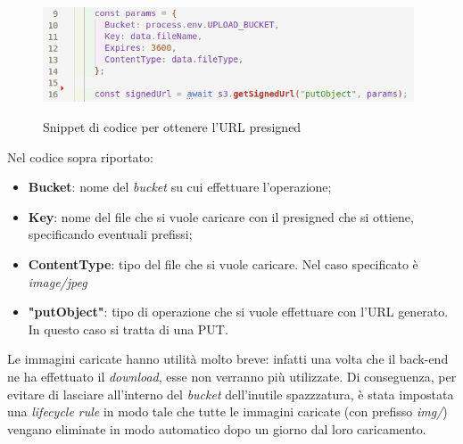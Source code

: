 	\begin{figure}[H]
		\centering
		\includegraphics[width=11cm]{immagini/getURL.png} \\
		\caption{\label{fig:getURL} Snippet di codice per ottenere l'URL presigned}
	\end{figure}
	
	Nel codice sopra riportato:
	\begin{itemize}
		\item \textbf{Bucket}: nome del \emph{bucket} su cui effettuare l'operazione;
		\item \textbf{Key}: nome del file che si vuole caricare con il presigned che si ottiene, specificando eventuali prefissi;
		\item \textbf{ContentType}: tipo del file che si vuole caricare. Nel caso specificato è \emph{image/jpeg}
		\item \textbf{"putObject"}: tipo di operazione che si vuole effettuare con l'URL generato. In questo caso si 
		tratta di una PUT.
	\end{itemize}

	Le immagini caricate hanno utilità molto breve: infatti una volta che il back-end ne ha effettuato il \emph{download}, 
	esse non verranno più utilizzate. Di conseguenza, per evitare di lasciare all'interno del \emph{bucket} dell'inutile spazzzatura, è stata impostata una \emph{lifecycle rule} in modo tale che tutte le immagini caricate (con prefisso \emph{img/}) vengano eliminate in modo automatico dopo un giorno dal loro caricamento.
	
